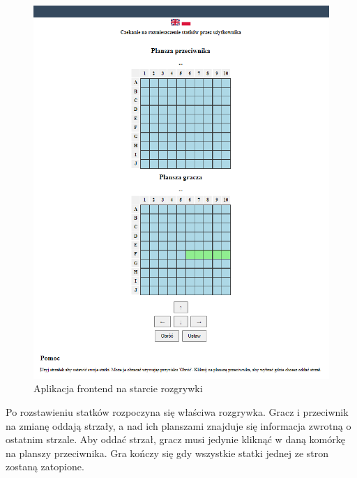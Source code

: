 \begin{figure}[!h]
    \label{fig:frontend-game}
    \centering \includegraphics[width=1\linewidth]{img/frontend-game.PNG}
    \caption{Aplikacja frontend na starcie rozgrywki}
\end{figure}

Po rozstawieniu statków rozpoczyna się właściwa rozgrywka. Gracz i przeciwnik na zmianę oddają strzały, a nad ich planszami znajduje się informacja zwrotną o ostatnim strzale. Aby oddać strzał, gracz musi jedynie kliknąć w daną komórkę na planszy przeciwnika. Gra kończy się gdy wszystkie statki jednej ze stron zostaną zatopione. 

